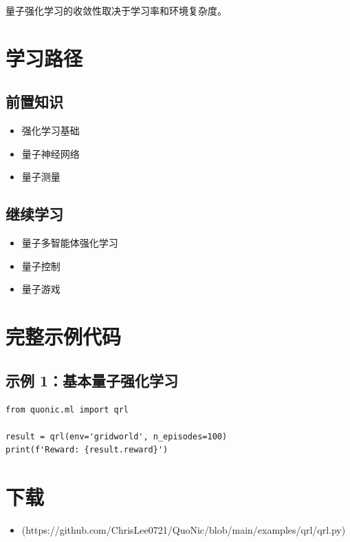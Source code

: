 \documentclass[12pt,a4paper]{article}
\begin{document}
量子强化学习的收敛性取决于学习率和环境复杂度。

\section{学习路径}

\subsection{前置知识}
\begin{itemize}
  \item 强化学习基础
  \item 量子神经网络
  \item 量子测量
\end{itemize}

\subsection{继续学习}
\begin{itemize}
  \item 量子多智能体强化学习
  \item 量子控制
  \item 量子游戏
\end{itemize}

\section{完整示例代码}

\subsection{示例 1：基本量子强化学习}

\begin{verbatim}
from quonic.ml import qrl

result = qrl(env='gridworld', n_episodes=100)
print(f'Reward: {result.reward}')
\end{verbatim}

\section{下载}

\begin{itemize}
  \item [qrl.py](https://github.com/ChrisLee0721/QuoNic/blob/main/examples/qrl/qrl.py)
\end{itemize}
\end{document}
